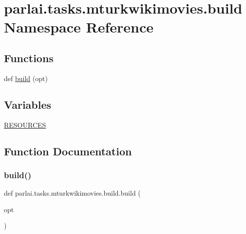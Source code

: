 \hypertarget{namespaceparlai_1_1tasks_1_1mturkwikimovies_1_1build}{}\section{parlai.\+tasks.\+mturkwikimovies.\+build Namespace Reference}
\label{namespaceparlai_1_1tasks_1_1mturkwikimovies_1_1build}
\subsection*{Functions}
\begin{DoxyCompactItemize}
\item 
def \hyperlink{namespaceparlai_1_1tasks_1_1mturkwikimovies_1_1build_aa6711f21fb369b452d25f98897f305d7}{build} (opt)
\end{DoxyCompactItemize}
\subsection*{Variables}
\begin{DoxyCompactItemize}
\item 
\hyperlink{namespaceparlai_1_1tasks_1_1mturkwikimovies_1_1build_a842cd64e233c6a702fc8438ee9de4088}{R\+E\+S\+O\+U\+R\+C\+ES}
\end{DoxyCompactItemize}


\subsection{Function Documentation}
\mbox{\label{namespaceparlai_1_1tasks_1_1mturkwikimovies_1_1build_aa6711f21fb369b452d25f98897f305d7}} 
\subsubsection{\texorpdfstring{build()}{build()}}
{\footnotesize\ttfamily def parlai.\+tasks.\+mturkwikimovies.\+build.\+build (\begin{DoxyParamCaption}\item[{}]{opt }\end{DoxyParamCaption})}




